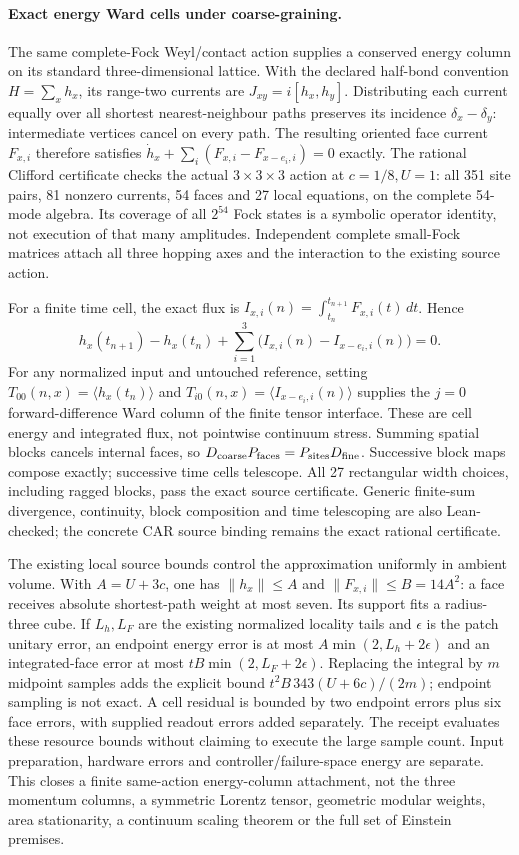 \paragraph{Exact energy Ward cells under coarse-graining.}
The same complete-Fock Weyl/contact action supplies a conserved energy
column on its standard three-dimensional lattice.  With the declared
half-bond convention $H=\sum_x h_x$, its range-two currents are
$J_{xy}=i[h_x,h_y]$.  Distributing each current equally over all shortest
nearest-neighbour paths preserves its incidence $\delta_x-\delta_y$:
intermediate vertices cancel on every path.  The resulting oriented face
current $F_{x,i}$ therefore satisfies
$\dot h_x+\sum_i(F_{x,i}-F_{x-e_i,i})=0$ exactly.
The rational Clifford certificate checks the actual $3\times3\times3$
action at $c=1/8,U=1$: all 351 site pairs, 81 nonzero currents, 54 faces
and 27 local equations, on the complete 54-mode algebra.  Its coverage of
all $2^{54}$ Fock states is a symbolic operator identity, not execution of
that many amplitudes.  Independent complete small-Fock matrices attach
all three hopping axes and the interaction to the existing source action.

For a finite time cell, the exact flux is
$I_{x,i}(n)=\int_{t_n}^{t_{n+1}}F_{x,i}(t)\,dt$.  Hence
\[
 h_x(t_{n+1})-h_x(t_n)
 +\sum_{i=1}^{3}\bigl(I_{x,i}(n)-I_{x-e_i,i}(n)\bigr)=0.
\]
For any normalized input and untouched reference, setting
$T_{00}(n,x)=\langle h_x(t_n)\rangle$ and
$T_{i0}(n,x)=\langle I_{x-e_i,i}(n)\rangle$ supplies the $j=0$
forward-difference Ward column of the finite tensor interface.
These are cell energy and integrated flux, not pointwise continuum stress.
Summing spatial blocks cancels internal faces, so
$D_{\rm coarse}P_{\rm faces}=P_{\rm sites}D_{\rm fine}$.
Successive block maps compose exactly; successive time cells telescope.
All 27 rectangular width choices, including ragged blocks, pass the exact
source certificate.  Generic finite-sum divergence, continuity, block
composition and time telescoping are also Lean-checked; the concrete CAR
source binding remains the exact rational certificate.

The existing local source bounds control the approximation uniformly in
ambient volume.  With $A=U+3c$, one has $\|h_x\|\leq A$ and
$\|F_{x,i}\|\leq B=14A^2$: a face receives absolute shortest-path weight
at most seven.  Its support fits a radius-three cube.  If $L_h,L_F$ are
the existing normalized locality tails and $\epsilon$ is the patch
unitary error, an endpoint energy error is at most
$A\min(2,L_h+2\epsilon)$ and an integrated-face error at most
$tB\min(2,L_F+2\epsilon)$.  Replacing the integral by $m$ midpoint
samples adds the explicit bound
$t^2B\,343(U+6c)/(2m)$; endpoint sampling is not exact.
A cell residual is bounded by two endpoint errors plus six face errors,
with supplied readout errors added separately.  The receipt evaluates
these resource bounds without claiming to execute the large sample count.
Input preparation, hardware errors and controller/failure-space energy
are separate.  This closes a finite same-action energy-column
attachment, not the three momentum columns, a symmetric Lorentz tensor,
geometric modular weights, area stationarity, a continuum scaling theorem
or the full set of Einstein premises.
